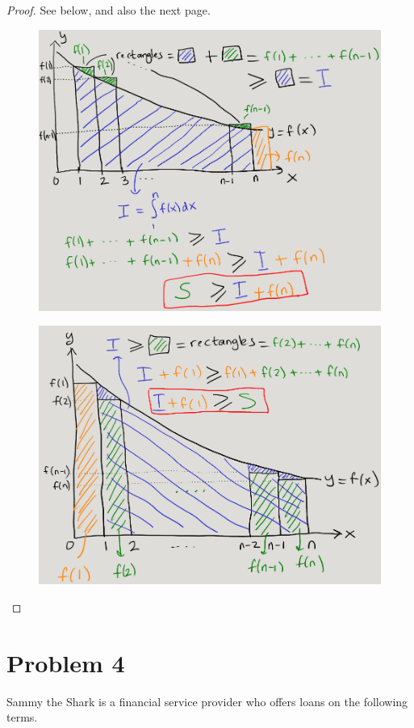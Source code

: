\documentclass[14pt]{extarticle}
\begin{document}
\begin{proof}
See below, and also the next page.
\begin{figure}[ht!]
\centering
\includegraphics[scale=0.5]{integral-1.png}
\end{figure}
\begin{figure}[ht!]
\centering
\includegraphics[scale=0.5]{integral-2.png}
\end{figure}
\end{proof}

\section{Problem 4}
Sammy the Shark is a financial service provider who offers loans on the following terms.
\end{document}

